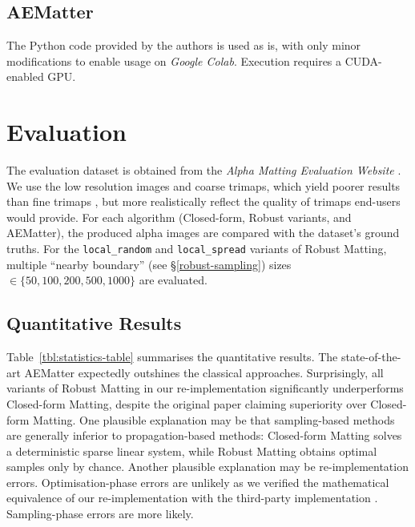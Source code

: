 \documentclass{article}
\theoremstyle{definition}
\begin{document}
\begin{multicols}{2}[]
\subsection{AEMatter}
The Python code provided by the authors is used as is, with only minor modifications to enable usage on \emph{Google Colab}. Execution requires a CUDA-enabled GPU.

\section{Evaluation}\label{evaluation}




The evaluation dataset is obtained from the \emph{Alpha Matting Evaluation Website} \cite{alpha-matting-dot-com}. We use the low resolution images and coarse trimaps, which yield poorer results than fine trimaps \cite{robust-matting}, but more realistically reflect the quality of trimaps end-users would provide. For each algorithm (Closed-form, Robust variants, and AEMatter), the produced alpha images are compared with the dataset's ground truths. For the \verb|local_random| and \verb|local_spread| variants of Robust Matting, multiple ``nearby boundary'' (see \S\ref{robust-sampling}) sizes $\in\{50,100,200,500,1000\}$ are evaluated.
\subsection{Quantitative Results}
Table~\ref{tbl:statistics-table} summarises the quantitative results. The state-of-the-art AEMatter expectedly outshines the classical approaches. Surprisingly, all variants of Robust Matting in our re-implementation significantly underperforms Closed-form Matting, despite the original paper claiming superiority over Closed-form Matting. One plausible explanation may be that sampling-based methods are generally inferior to propagation-based methods: Closed-form Matting solves a deterministic sparse linear system, while Robust Matting obtains optimal samples only by chance. Another plausible explanation may be re-implementation errors. Optimisation-phase errors are unlikely as we verified the mathematical equivalence of our re-implementation with the third-party implementation \cite{web:robust-cpp-github}. Sampling-phase errors are more likely.


\end{multicols}
\end{document}
